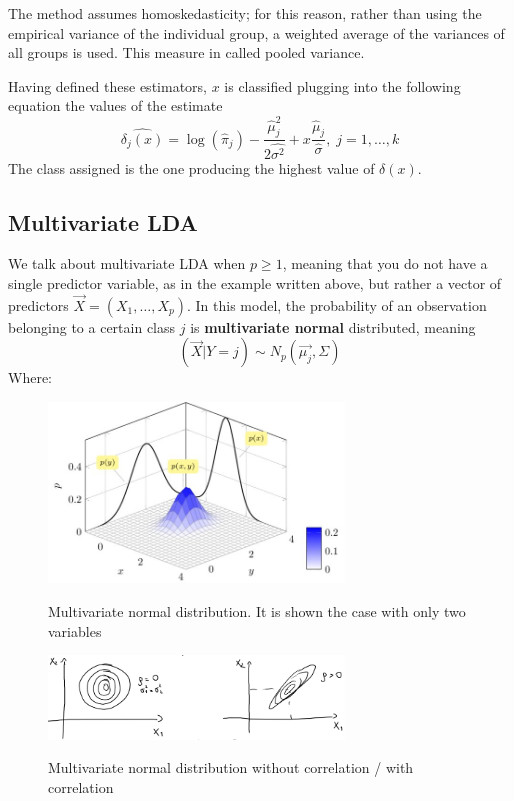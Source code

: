       The method assumes homoskedasticity; for this reason, rather than using
      the empirical variance of the individual group, a weighted average of the
      variances of all groups is used. This measure in called pooled variance. 

      Having defined these estimators, $x$ is classified plugging into the
      following equation the values of the estimate  
      $$\hat{\delta_j(x)} = \log(\hat{\pi}_j)
      -\frac{\hat{\mu}_j^2}{2\hat{\sigma^2}} +
      x\frac{\hat{\mu}_j}{\hat{\sigma}}, \; j = 1, \dots, k$$ The class assigned
      is the one producing the highest value of $\delta(x)$.

      
    \subsection{Multivariate LDA}
      We talk about multivariate LDA when $p \geq 1$, meaning that you do not
      have a single predictor variable, as in the example written above, but
      rather a vector of predictors $\vec{X} = (X_1, \dots, X_p)$. In this
      model, the probability of an observation belonging to a certain class $j$
      is \textbf{multivariate normal} distributed, meaning
      $$(\vec{X}|Y=j) \sim N_p(\vec{\mu_j}, \Sigma)$$ Where:
      
      \begin{figure}[h]
        \caption{Multivariate normal distribution. It is shown the case with
        only two variables}
        \centering
        \includegraphics[width=0.7\textwidth]{MultivariateNormalDist}
        \label{fig: Multivariate Normal Distribution}
        \end{figure}
      \begin{figure}[h]
        \caption{Multivariate normal distribution without correlation / with correlation}
        \centering
        \includegraphics[width=0.7\textwidth]{MultivariateNormalDist-Correlation}
        \label{fig: Multivariate Normal Distribution - Correlation}
        \end{figure}



